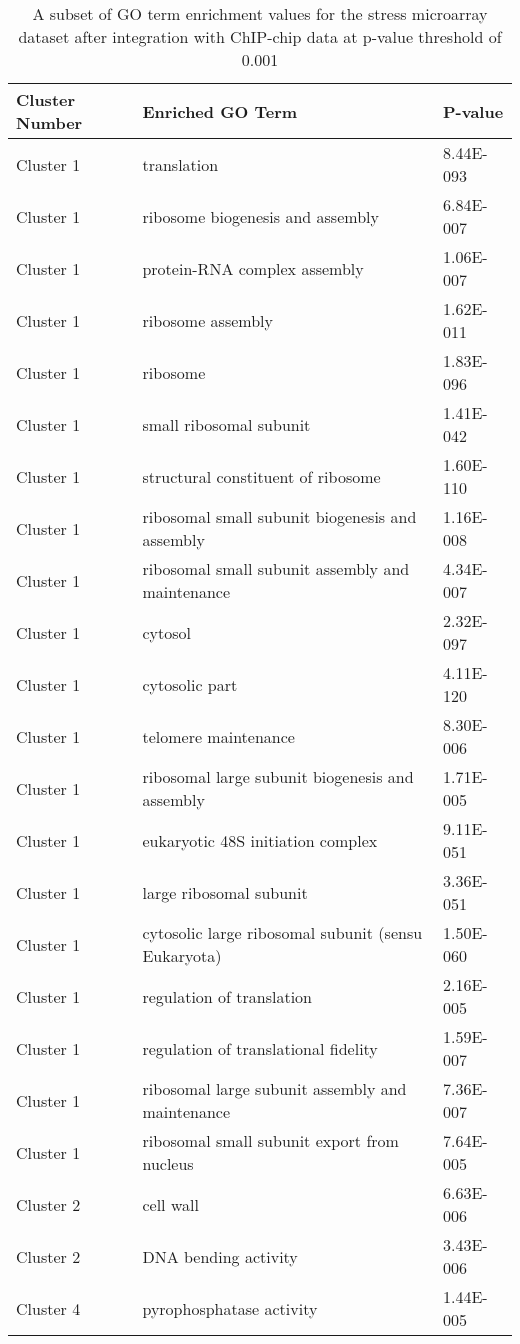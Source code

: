 \begin{table}[tp]
\centering
\begin{tabular}{|l|l|l|}
\hline
Cluster Number&Enriched GO Term&P-value\\
\hline
Cluster 1 &	translation                                              &	8.44E-093 \\ \hline
Cluster 1 &	ribosome biogenesis and assembly                         &	6.84E-007 \\ \hline
Cluster 1 &	protein-RNA complex assembly                             &	1.06E-007 \\ \hline
Cluster 1 &	ribosome assembly                                        &	1.62E-011 \\ \hline
Cluster 1 &	ribosome                                                 &	1.83E-096 \\ \hline 
Cluster 1 &	small ribosomal subunit					 &	1.41E-042 \\ \hline
Cluster 1 &	structural constituent of ribosome			 &	1.60E-110 \\ \hline
Cluster 1 &	ribosomal small subunit biogenesis and assembly		 &	1.16E-008 \\ \hline
Cluster 1 &	ribosomal small subunit assembly and maintenance	 &	4.34E-007 \\ \hline
Cluster 1 &	cytosol							 &	2.32E-097 \\ \hline 
Cluster 1 &	cytosolic part						 &	4.11E-120 \\ \hline
Cluster 1 &	telomere maintenance					 &	8.30E-006 \\ \hline
Cluster 1 &	ribosomal large subunit biogenesis and assembly		 &	1.71E-005 \\ \hline
Cluster 1 &	eukaryotic 48S initiation complex			 &	9.11E-051 \\ \hline
Cluster 1 &	large ribosomal subunit					 &	3.36E-051 \\ \hline
Cluster 1 &	cytosolic large ribosomal subunit (sensu Eukaryota)	 &	1.50E-060 \\ \hline
Cluster 1 &	regulation of translation				 &	2.16E-005 \\ \hline
Cluster 1 &	regulation of translational fidelity			 &	1.59E-007 \\ \hline
Cluster 1 &	ribosomal large subunit assembly and maintenance	 &	7.36E-007 \\ \hline
Cluster 1 &	ribosomal small subunit export from nucleus		 &	7.64E-005 \\ \hline
Cluster 2 &	cell wall						 &	6.63E-006 \\ \hline
Cluster 2 &	DNA bending activity					 &	3.43E-006 \\ \hline
Cluster 4 &	pyrophosphatase activity				 &	1.44E-005 \\ 
\hline

\end{tabular}
\caption[A subset of GO term enrichment values for the stress microarray dataset]{A subset of GO term enrichment values for the stress microarray dataset after integration with ChIP-chip data at p-value threshold of 0.001}
\label{tab:stress_chip_0.0001}
\end{table}

